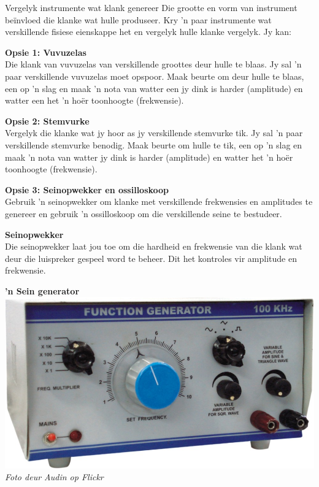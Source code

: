 \begin{activity}{Vergelyk instrumente wat klank genereer}
Die grootte en vorm van instrument be\"invloed die klanke wat hulle produseer. Kry 'n paar instrumente wat verskillende fisiese eienskappe het en vergelyk hulle klanke vergelyk. Jy kan:\par\vspace{1em}
\begin{minipage}{.45\columnwidth}
\textbf{Opsie 1: Vuvuzelas}\\
Die klank van vuvuzelas van verskillende groottes deur hulle te blaas.
Jy sal 'n paar verskillende vuvuzelas moet opspoor. Maak beurte om deur hulle te blaas, een op 'n slag en maak 'n nota van watter een jy dink is harder (amplitude) en watter een het 'n ho\"er toonhoogte (frekwensie).\vspace{1em}

\end{minipage}\hspace{.05\columnwidth}
\begin{minipage}{.45\columnwidth}
\textbf{Opsie 2: Stemvurke}\\
Vergelyk die klanke wat jy hoor as jy verskillende stemvurke tik.
Jy sal 'n paar verskillende stemvurke benodig. Maak beurte om hulle te tik, een op 'n slag en maak 'n nota van watter jy dink is harder (amplitude) en watter het 'n ho\"er toonhoogte (frekwensie).\end{minipage}\par
\textbf{Opsie 3: Seinopwekker en ossilloskoop}\\
Gebruik 'n seinopwekker om klanke met verskillende frekwensies en amplitudes te genereer en gebruik 'n ossilloskoop om die verskillende seine te bestudeer.\\
\begin{minipage}{.5\textwidth}
\textbf{Seinopwekker}\\
Die seinopwekker laat jou toe om die hardheid en frekwensie van die klank wat deur die luispreker gespeel word te beheer. Dit het kontroles vir amplitude en frekwensie.\\
\end{minipage}
\begin{minipage}{.5\textwidth}
\begin{center}
\textbf{ 'n Sein generator}\\
\includegraphics[width=.8\textwidth]{../Grade10/photos/function_generator.jpg}\\
\textsl{Foto deur Audin op Flickr}\\
\end{center}
\end{minipage}


\end{activity}
